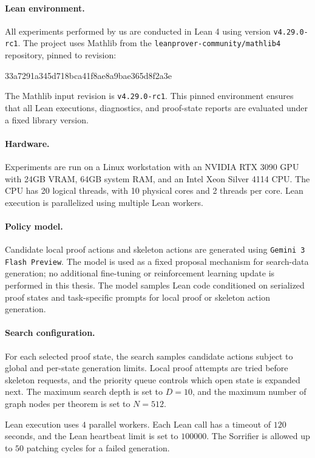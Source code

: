 \paragraph{Lean environment.}
All experiments performed by us are conducted in Lean 4 using version \texttt{v4.29.0-rc1}. The project uses Mathlib \citep{mathlib2020}
from the \texttt{leanprover-community/mathlib4} repository, pinned to revision:
\begin{leanblock}
33a7291a345d718bca41f8ae8a9bae365d8f2a3e
\end{leanblock}
The Mathlib input revision is \texttt{v4.29.0-rc1}. This pinned environment ensures that all Lean
executions, diagnostics, and proof-state reports are evaluated under a fixed library version.

\paragraph{Hardware.}
Experiments are run on a Linux workstation with an NVIDIA RTX 3090 GPU with 24GB VRAM, 64GB
system RAM, and an Intel Xeon Silver 4114 CPU. The CPU has 20 logical threads, with 10 physical cores
and 2 threads per core. Lean execution is parallelized using multiple Lean workers.

\paragraph{Policy model.}
Candidate local proof actions and skeleton actions are generated using \texttt{Gemini 3 Flash Preview}. The model is used
as a fixed proposal mechanism for search-data generation; no additional fine-tuning or reinforcement
learning update is performed in this thesis. The model samples Lean code conditioned on serialized proof
states and task-specific prompts for local proof or skeleton action generation.

\paragraph{Search configuration.}
For each selected proof state, the search samples candidate actions subject to global and per-state
generation limits. Local proof attempts are tried before skeleton requests, and the priority queue controls
which open state is expanded next. The maximum search depth is set to \(D=10\), and the maximum
number of graph nodes per theorem is set to \(N=512\).

Lean execution uses \(4\) parallel workers. Each Lean call has a timeout of \(120\) seconds, and the
Lean heartbeat limit is set to \(100000\). The Sorrifier is allowed up to \(50\) patching cycles for a
failed generation.

